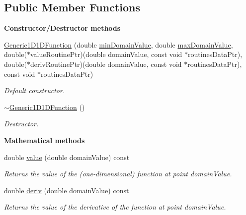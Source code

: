 \subsection*{Public Member Functions}
\begin{Indent}{\bf Constructor/\-Destructor methods}\par
\begin{DoxyCompactItemize}
\item 
\hyperlink{class_q_u_e_s_o_1_1_generic1_d1_d_function_a0b699f452c09656b05f535a92adcbdc3}{Generic1\-D1\-D\-Function} (double \hyperlink{class_q_u_e_s_o_1_1_base1_d1_d_function_a4c110e621ef1ac557bbcc60d41f5a3c2}{min\-Domain\-Value}, double \hyperlink{class_q_u_e_s_o_1_1_base1_d1_d_function_ad2b80d0c52c0cb56c89f70f30b3bb19e}{max\-Domain\-Value}, double($\ast$value\-Routine\-Ptr)(double domain\-Value, const void $\ast$routines\-Data\-Ptr), double($\ast$deriv\-Routine\-Ptr)(double domain\-Value, const void $\ast$routines\-Data\-Ptr), const void $\ast$routines\-Data\-Ptr)
\begin{DoxyCompactList}\small\item\em Default constructor. \end{DoxyCompactList}\item 
\hyperlink{class_q_u_e_s_o_1_1_generic1_d1_d_function_adf1a10563a2aa11928d63c44ce9c9fd2}{$\sim$\-Generic1\-D1\-D\-Function} ()
\begin{DoxyCompactList}\small\item\em Destructor. \end{DoxyCompactList}\end{DoxyCompactItemize}
\end{Indent}
\begin{Indent}{\bf Mathematical methods}\par
\begin{DoxyCompactItemize}
\item 
double \hyperlink{class_q_u_e_s_o_1_1_generic1_d1_d_function_a4ed092b36144d91ac573e871062cca16}{value} (double domain\-Value) const 
\begin{DoxyCompactList}\small\item\em Returns the value of the (one-\/dimensional) function at point {\ttfamily domain\-Value}. \end{DoxyCompactList}\item 
double \hyperlink{class_q_u_e_s_o_1_1_generic1_d1_d_function_a6e7f189c2cf7f0a88573a23a88229566}{deriv} (double domain\-Value) const 
\begin{DoxyCompactList}\small\item\em Returns the value of the derivative of the function at point {\ttfamily domain\-Value}. \end{DoxyCompactList}\end{DoxyCompactItemize}
\end{Indent}
